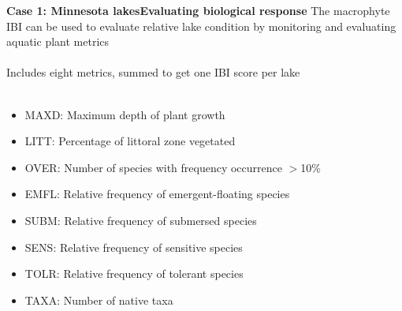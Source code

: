 \documentclass[serif]{beamer}\usepackage[]{graphicx}\usepackage[]{color}
\begin{document}
\begin{frame}{\textbf{Case 1: Minnesota lakes}}{\textbf{Evaluating biological response}}
\onslide<+->
The macrophyte IBI can be used to evaluate relative lake condition by monitoring and evaluating aquatic plant metrics \cite{Beck10,Beck13} \\~\\
\onslide<+->
Includes eight metrics, summed to get one IBI score per lake \\~\\
\begin{itemize}
\item{MAXD: Maximum depth of plant growth}
\item{LITT: Percentage of littoral zone vegetated}
\item{OVER: Number of species with frequency occurrence $>$10\%}
\item{EMFL: Relative frequency of emergent-floating species}
\item{SUBM: Relative frequency of submersed species}
\item{SENS: Relative frequency of sensitive species}
\item{TOLR: Relative frequency of tolerant species}
\item{TAXA: Number of native taxa \\~\\}
\end{itemize}
\end{frame}
\end{document}

